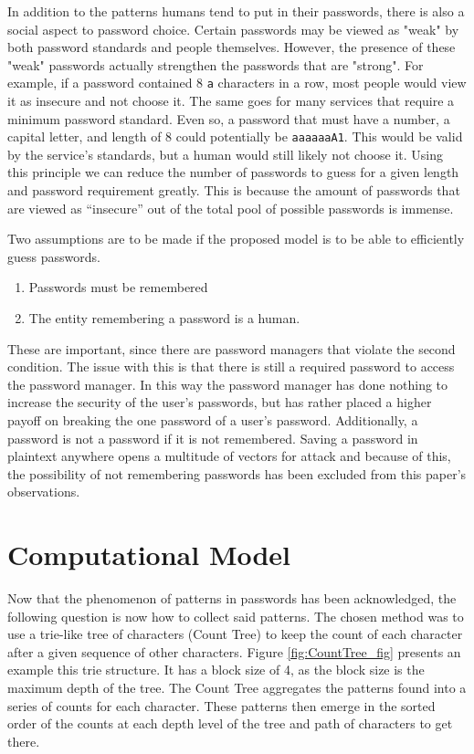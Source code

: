 \documentclass[11pt]{article}
\begin{document}
In addition to the patterns humans tend to put in their passwords, there is also a social aspect to password choice. Certain passwords may be viewed as "weak" by both password standards and people themselves. However, the presence of these "weak" passwords actually strengthen the passwords that are "strong". For example, if a password contained 8 \texttt{a} characters in a row, most people would view it as insecure and not choose it. The same goes for many services that require a minimum password standard. Even so, a password that must have a number, a capital letter, and length of 8 could potentially be \texttt{aaaaaaA1}. This would be valid by the service's standards, but a human would still likely not choose it. Using this principle we can reduce the number of passwords to guess for a given length and password requirement greatly. This is because the amount of passwords that are viewed as “insecure” out of the total pool of possible passwords is immense.

Two assumptions are to be made if the proposed model is to be able to efficiently guess passwords.

\begin{enumerate}
    \item Passwords must be remembered
    \item The entity remembering a password is a human.
\end{enumerate}

These are important, since there are password managers that violate the second condition. The issue with this is that there is still a required password to access the password manager. In this way the password manager has done nothing to increase the security of the user’s passwords, but has rather placed a higher payoff on breaking the one password of a user’s password. Additionally, a password is not a password if it is not remembered. Saving a password in plaintext anywhere opens a multitude of vectors for attack and because of this, the possibility of not remembering passwords has been excluded from this paper’s observations.

\section{Computational Model} \label{computational_model_sec}

Now that the phenomenon of patterns in passwords has been acknowledged, the following question is now how to collect said patterns. The chosen method was to use a trie-like tree of characters (Count Tree) to keep the count of each character after a given sequence of other characters. Figure \ref{fig:CountTree_fig} presents an example this trie structure. It has a block size of 4, as the block size is the maximum depth of the tree. The Count Tree aggregates the patterns found into a series of counts for each character. These patterns then emerge in the sorted order of the counts at each depth level of the tree and path of characters to get there.
\end{document}
